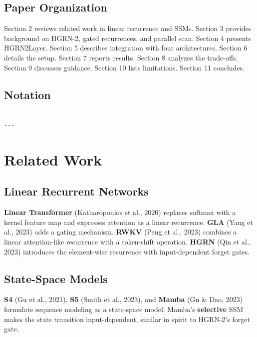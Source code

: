 \subsection{Paper Organization}

Section 2 reviews related work in linear recurrence and SSMs. Section 3 
provides background on HGRN-2, gated recurrences, and parallel scan. 
Section 4 presents HGRN2Layer. Section 5 describes integration with four 
architectures. Section 6 details the setup. Section 7 reports results. 
Section 8 analyzes the trade-offs. Section 9 discusses guidance. Section 10 
lists limitations. Section 11 concludes.



\subsection{Notation}

\begin{lstlisting}

---
\end{lstlisting}

\section{Related Work}

\subsection{Linear Recurrent Networks}

\textbf{Linear Transformer} (Katharopoulos et al., 2020) replaces softmax with a 
kernel feature map and expresses attention as a linear recurrence. \textbf{GLA} 
(Yang et al., 2023) adds a gating mechanism. \textbf{RWKV} (Peng et al., 2023) 
combines a linear attention-like recurrence with a token-shift operation. 
\textbf{HGRN} (Qin et al., 2023) introduces the element-wise recurrence with 
input-dependent forget gates.

\subsection{State-Space Models}

\textbf{S4} (Gu et al., 2021), \textbf{S5} (Smith et al., 2023), and \textbf{Mamba} (Gu \& 
Dao, 2023) formulate sequence modeling as a state-space model. Mamba's 
\textbf{selective} SSM makes the state transition input-dependent, similar in 
spirit to HGRN-2's forget gate.

